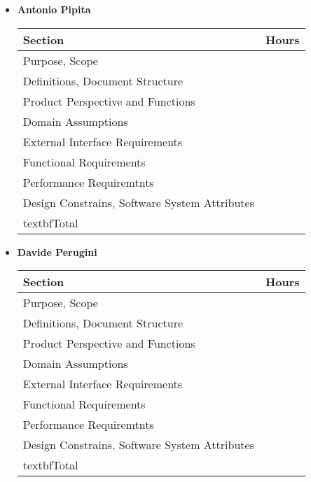 \begin{itemize}
\item \textbf{Antonio Pipita}

\begin{table}[!h]
\centering
\begin{tabular}{|l|l|}
\hline
\textbf{Section}														&		\textbf{Hours}  \\ \hline
Purpose, Scope														&  	\\ \hline
Definitions, Document Structure							&  	\\ \hline
Product Perspective and Functions						&  	\\ \hline
Domain Assumptions												&  	\\ \hline
External Interface Requirements							&  	\\ \hline
Functional Requirements										&  	\\ \hline
Performance Requiremtnts									&  	\\ \hline
Design Constrains, Software System Attributes	&  	\\ \hline
textbf{Total}															&  	\\ \hline
\end{tabular}
\end{table}

\item \textbf{Davide Perugini}

\begin{table}[!h]
\begin{tabular}{|l|l|}
\hline
\textbf{Section}														&		\textbf{Hours}  \\ \hline
Purpose, Scope														&  	\\ \hline
Definitions, Document Structure							&  	\\ \hline
Product Perspective and Functions						&  	\\ \hline
Domain Assumptions												&  	\\ \hline
External Interface Requirements							&  	\\ \hline
Functional Requirements										&  	\\ \hline
Performance Requiremtnts									&  	\\ \hline
Design Constrains, Software System Attributes	&  	\\ \hline
textbf{Total}															&  	\\ \hline
\end{tabular}
\end{table}


\end{itemize}
